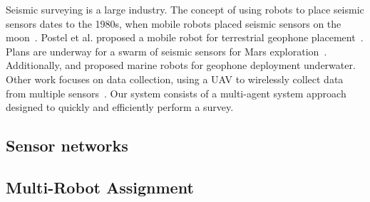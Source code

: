Seismic surveying is a large industry.
The concept of using robots to place seismic sensors dates to the 1980s, when mobile robots placed seismic sensors on the moon~\cite{LSisMSE81}. Postel et al. proposed a mobile robot for terrestrial geophone placement~\cite{DSSMaA14}. Plans are underway for a swarm of seismic sensors for Mars exploration~\cite{MAPL2006}.
Additionally, \cite{muyzert2015marine} and \cite{postel2014drone} proposed marine robots for geophone deployment underwater. 
Other work  focuses on data collection, using a UAV to wirelessly collect data from multiple sensors~\cite{wilcox2013seismic}. 
Our system consists of a multi-agent system approach designed to quickly and efficiently perform a survey.


\subsection{Sensor networks}
\subsection{Multi-Robot Assignment}
